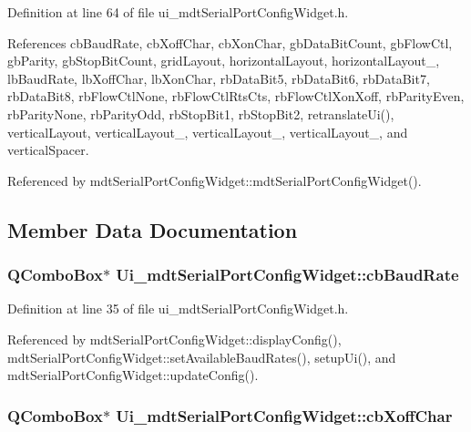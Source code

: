 Definition at line 64 of file ui\-\_\-mdt\-Serial\-Port\-Config\-Widget.\-h.



References cb\-Baud\-Rate, cb\-Xoff\-Char, cb\-Xon\-Char, gb\-Data\-Bit\-Count, gb\-Flow\-Ctl, gb\-Parity, gb\-Stop\-Bit\-Count, grid\-Layout, horizontal\-Layout, horizontal\-Layout\-\_, lb\-Baud\-Rate, lb\-Xoff\-Char, lb\-Xon\-Char, rb\-Data\-Bit5, rb\-Data\-Bit6, rb\-Data\-Bit7, rb\-Data\-Bit8, rb\-Flow\-Ctl\-None, rb\-Flow\-Ctl\-Rts\-Cts, rb\-Flow\-Ctl\-Xon\-Xoff, rb\-Parity\-Even, rb\-Parity\-None, rb\-Parity\-Odd, rb\-Stop\-Bit1, rb\-Stop\-Bit2, retranslate\-Ui(), vertical\-Layout, vertical\-Layout\-\_, vertical\-Layout\-\_, vertical\-Layout\-\_, and vertical\-Spacer.



Referenced by mdt\-Serial\-Port\-Config\-Widget\-::mdt\-Serial\-Port\-Config\-Widget().



\subsection{Member Data Documentation}
\hypertarget{class_ui__mdt_serial_port_config_widget_a453cdc3ba0f2ca103e77ebc77e1b1439}{
\subsubsection[{cb\-Baud\-Rate}]{\setlength{\rightskip}{0pt plus 5cm}Q\-Combo\-Box$\ast$ Ui\-\_\-mdt\-Serial\-Port\-Config\-Widget\-::cb\-Baud\-Rate}}\label{class_ui__mdt_serial_port_config_widget_a453cdc3ba0f2ca103e77ebc77e1b1439}


Definition at line 35 of file ui\-\_\-mdt\-Serial\-Port\-Config\-Widget.\-h.



Referenced by mdt\-Serial\-Port\-Config\-Widget\-::display\-Config(), mdt\-Serial\-Port\-Config\-Widget\-::set\-Available\-Baud\-Rates(), setup\-Ui(), and mdt\-Serial\-Port\-Config\-Widget\-::update\-Config().

\hypertarget{class_ui__mdt_serial_port_config_widget_a1fa11aa8b0c9e4a7fcbe9f3506b6a62c}{
\subsubsection[{cb\-Xoff\-Char}]{\setlength{\rightskip}{0pt plus 5cm}Q\-Combo\-Box$\ast$ Ui\-\_\-mdt\-Serial\-Port\-Config\-Widget\-::cb\-Xoff\-Char}}\label{class_ui__mdt_serial_port_config_widget_a1fa11aa8b0c9e4a7fcbe9f3506b6a62c}


